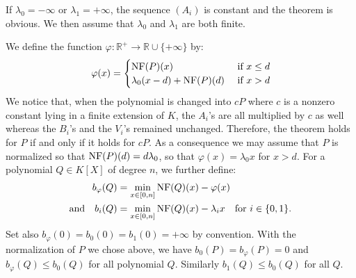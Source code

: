 \documentclass{sig-alternate-2013}
\DeclareMathOperator{\NP}{NP}
\newcommand{\slp}{\text{\rm slp}}
\newcommand{\R}{\mathbb R}
\newcommand{\NF}{\text{\rm NF}}
\begin{document}
\begin{comment}
This is enough to conclude on the Newton polygon of $R_{i+1}.$
Indeed, thanks to \eqref{eq:Riplus}, we obtain that 
\[\NP (R_i) \geq -\lambda_0+2^i(\lambda_1-\lambda_0)+(d-1) \slp (\lambda_0). \]
We can proceed similarly for $1-V_{i+1} B_{i+1}$ using \eqref{eq:ViBiplus}.

Finally, we can apply \eqref{eqdef:Si2} for $i+1,$
\begin{align*}
S_{i+1} & = (B_{i+1} R_{i+1} + (1-V_{i+1} B_{i+1}) S_{i} \\
& + (1-V_{i+1} B_{i+1})(S_{i+1}-S_{i})) \% A_{i+1},
\end{align*}
to obtain the desired minoration on $\NP (S_{i+1}).$ This concludes the proof.
\end{proof}

\subsubsection{Xavier's proof}
\end{comment}

If $\lambda_0 = -\infty$ or $\lambda_1 = +\infty$, the sequence $(A_i)$
is constant and the theorem is obvious. We then assume that $\lambda_0$
and $\lambda_1$ are both finite.

We define the function $\varphi : \R^+ \to \R 
\cup \{+\infty\}$ by:
\begin{equation} \label{eqdef:functionphi}
\varphi(x) = \begin{cases} \NF(P)(x) &\mbox{ if $x \leq d$} \\
\lambda_0 (x - d) + \NF(P)(d) &\mbox{ if $x > d$} \end{cases}
\end{equation}
We notice that, when the polynomial is changed into $cP$ where $c$ is a 
nonzero constant lying in a finite extension of $K$, the $A_i$'s are all 
multiplied by $c$ as well whereas the $B_i$'s and the $V_i$'s remained 
unchanged. Therefore, the theorem holds for $P$ if and only if it holds 
for $cP$. As a consequence we may assume that $P$ is normalized so that 
$\NF(P)(d) = d \lambda_0$, so that $\varphi(x) = \lambda_0 x$ for $x > d$.
For a polynomial $Q \in K[X]$ of degree $n$, we further define:
\begin{align}
b_\varphi(Q) & = \min_{x \in [0,n]} \NF(Q)(x) - \varphi(x) 
\label{eqdef:bphi} \\
\text{and} \quad
b_i(Q) & = \min_{x \in [0,n]} \NF(Q)(x) - \lambda_i x
\quad \text{for } i \in \{0,1\}.
\label{eqdef:b0}
\end{align}
Set also $b_\varphi(0) = b_0(0) = b_1(0) = +\infty$ by convention.
With the normalization of $P$ we chose above, we have $b_0(P)
= b_\varphi(P) = 0$ and $b_\varphi(Q) \leq b_0(Q)$ for all polynomial
$Q$. Similarly $b_1(Q) \leq b_0(Q)$ for all $Q$.
\end{document}
